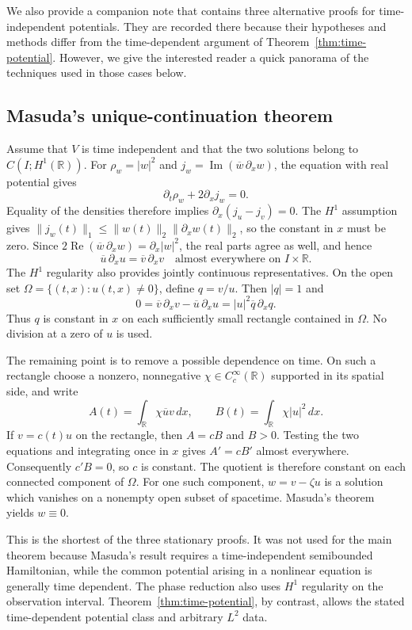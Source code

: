 \documentclass[11pt]{amsart}
\theoremstyle{remark}
\newcommand{\R}{\mathbb R}
\newcommand{\1}{\mathbf 1}
\begin{document}
We also provide a companion note that contains three alternative proofs for time-independent potentials. They are recorded there because their hypotheses and methods differ from the time-dependent argument of Theorem~\ref{thm:time-potential}. However, we give the interested reader a quick panorama of the techniques used in those cases below. 

\subsection{Masuda's unique-continuation theorem}

Assume that $V$ is time independent and that the two solutions belong to
$C(I;H^1(\R))$.  For
$\rho_w=|w|^2$ and
$j_w=\operatorname{Im}(\overline w\,\partial_xw)$, the equation with real
potential gives
\[
 \partial_t\rho_w+2\partial_x j_w=0.
\]
Equality of the densities therefore implies
$\partial_x(j_u-j_v)=0$.  The $H^1$ assumption gives
$\|j_w(t)\|_1\le \|w(t)\|_2\|\partial_xw(t)\|_2$, so the constant in $x$
must be zero.  Since
$2\operatorname{Re}(\overline w\,\partial_xw)=\partial_x|w|^2$, the real
parts agree as well, and hence
\[
 \overline u\,\partial_xu=\overline v\,\partial_xv
 \quad\text{almost everywhere on }I\times\R.
\]
The $H^1$ regularity also provides jointly continuous representatives.  On
the open set $\Omega=\{(t,x):u(t,x)\ne0\}$, define $q=v/u$.  Then $|q|=1$
and
\[
 0=\overline v\,\partial_xv-\overline u\,\partial_xu
   =|u|^2\overline q\,\partial_xq.
\]
Thus $q$ is constant in $x$ on each sufficiently small rectangle contained
in $\Omega$.  No division at a zero of $u$ is used.

The remaining point is to remove a possible dependence on time.  On such a
rectangle choose a nonzero, nonnegative $\chi\in C_c^\infty(\R)$ supported
in its spatial side, and write
\[
 A(t)=\int_\R\chi\overline u v\,dx,
 \qquad B(t)=\int_\R\chi|u|^2\,dx.
\]
If $v=c(t)u$ on the rectangle, then $A=cB$ and $B>0$.  Testing the two
equations and integrating once in $x$ gives $A'=cB'$ almost everywhere.
Consequently $c'B=0$, so $c$ is constant.  The quotient is therefore
constant on each connected component of $\Omega$.  For one such component,
$w=v-\zeta u$ is a solution which vanishes on a nonempty open subset of
spacetime.  Masuda's theorem~\cite{Masuda} yields $w\equiv0$.

This is the shortest of the three stationary proofs.  It was not used for the
main theorem because Masuda's result requires a time-independent semibounded
Hamiltonian, while the common potential arising in a nonlinear equation is
generally time dependent.  The phase reduction also uses $H^1$ regularity on
the observation interval.  Theorem~\ref{thm:time-potential}, by contrast,
allows the stated time-dependent potential class and arbitrary $L^2$ data.
\end{document}
